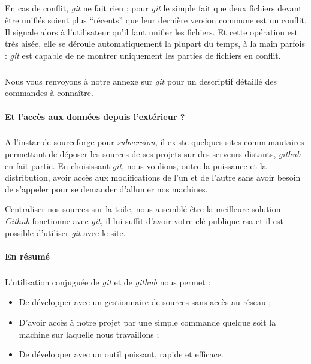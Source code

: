 \subparagraph{}
En cas de conflit, \textit{git} ne fait rien ; pour \textit{git} le simple fait que deux fichiers devant être unifi\'es soient plus ``récents'' que leur dernière version commune est un conflit. Il signale alors à l'utilisateur qu'il faut unifier les fichiers. Et cette op\'eration est très aisée, elle se déroule automatiquement la plupart du temps, à la main parfois : \textit{git} est capable de ne montrer uniquement les parties de fichiers en conflit.


\subparagraph{}
Nous vous renvoyons à notre annexe sur \textit{git} pour un descriptif détaillé des commandes à connaître.


\paragraph{Et l'accès aux données depuis l'extérieur ?}
\subparagraph{}
A l'instar de sourceforge pour \textit{subversion}, il existe quelques sites communautaires permettant de déposer les sources de ses projets sur des serveurs distants, \textit{github} en fait partie. En choisissant \textit{git}, nous voulions, outre la puissance et la distribution, avoir accès aux modifications de l'un et de l'autre sans avoir besoin de s'appeler pour se demander d'allumer nos machines.

Centraliser nos sources sur la toile, nous a semblé être la meilleure solution. \textit{Github} fonctionne avec \textit{git}, il lui suffit d'avoir votre clé publique rsa et il est possible d'utiliser \textit{git} avec le site. 

\paragraph{En résumé}

\subparagraph{}
L'utilisation conjuguée de \textit{git} et de \textit{github} nous permet :
\begin{itemize}
 \item De développer avec un gestionnaire de sources sans accès au réseau ;
 \item D'avoir accès à notre projet par une simple commande quelque soit la machine sur laquelle nous travaillons ;
\item De développer avec un outil puissant, rapide et efficace.
\end{itemize}

